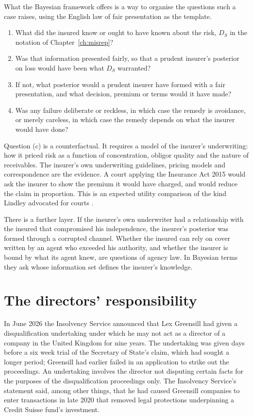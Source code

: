What the Bayesian framework offers is a way to organise the questions such a case raises, using the English law of fair presentation as the template.
\begin{enumerate}[label=(\alph*)]
\item What did the insured know or ought to have known about the risk, $D_S$ in the notation of Chapter~\ref{ch:misrep}?
\item Was that information presented fairly, so that a prudent insurer's posterior on loss would have been what $D_S$ warranted?
\item If not, what posterior would a prudent insurer have formed with a fair presentation, and what decision, premium or terms would it have made?
\item Was any failure deliberate or reckless, in which case the remedy is avoidance, or merely careless, in which case the remedy depends on what the insurer would have done?
\end{enumerate}
Question (c) is a counterfactual. It requires a model of the insurer's underwriting: how it priced risk as a function of concentration, obligor quality and the nature of receivables. The insurer's own underwriting guidelines, pricing models and correspondence are the evidence. A court applying the Insurance Act 2015 would ask the insurer to show the premium it would have charged, and would reduce the claim in proportion. This is an expected utility comparison of the kind Lindley advocated for courts \citep{lindley1991}.

There is a further layer. If the insurer's own underwriter had a relationship with the insured that compromised his independence, the insurer's posterior was formed through a corrupted channel. Whether the insured can rely on cover written by an agent who exceeded his authority, and whether the insurer is bound by what its agent knew, are questions of agency law. In Bayesian terms they ask whose information set defines the insurer's knowledge.

\section{The directors' responsibility}

In June 2026 the Insolvency Service announced that Lex Greensill had given a disqualification undertaking under which he may not act as a director of a company in the United Kingdom for nine years. The undertaking was given days before a six week trial of the Secretary of State's claim, which had sought a longer period; Greensill had earlier failed in an application to strike out the proceedings. An undertaking involves the director not disputing certain facts for the purposes of the disqualification proceedings only. The Insolvency Service's statement said, among other things, that he had caused Greensill companies to enter transactions in late 2020 that removed legal protections underpinning a Credit Suisse fund's investment.


